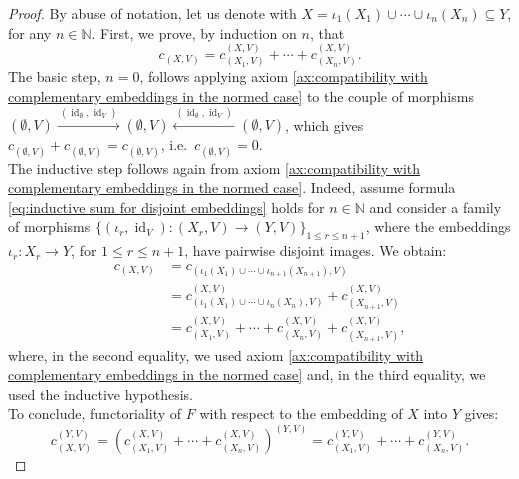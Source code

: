 \documentclass{amsart}
\theoremstyle{definition}
\theoremstyle{plain}
\newcommand{\N}{\mathbb{N}}
\newcommand{\id}{\operatorname{id}}
\begin{document}
        \begin{proof}
            By abuse of notation, let us denote with $X = \iota_1(X_1) \cup \cdots \cup \iota_n(X_n) \subseteq Y$, for any $n \in \N$. 
            First, we prove, by induction on $n$, that 
            \begin{equation}
            \label{eq:inductive sum for disjoint embeddings}
                c_{(X,V)} = c_{(X_1,V)}^{(X,V)} + \cdots + c_{(X_n,V)}^{(X,V)}.
            \end{equation}
            The basic step, $n=0$, follows applying axiom \ref{ax:compatibility with complementary embeddings in the normed case} to the couple of morphisms $(\emptyset,V) \xrightarrow{~(\id_{\emptyset},\id_V)~} (\emptyset,V) \xleftarrow{~(\id_{\emptyset},\id_V)~} (\emptyset,V)$, which gives $c_{(\emptyset,V)} + c_{(\emptyset,V)} = c_{(\emptyset,V)}$, i.e.~$c_{(\emptyset,V)} = 0$. \\
            The inductive step follows again from axiom \ref{ax:compatibility with complementary embeddings in the normed case}. 
            Indeed, assume formula \eqref{eq:inductive sum for disjoint embeddings} holds for $n \in \N$ and consider a family of morphisms $\{(\iota_r,\id_V) \colon (X_r,V) \rightarrow (Y,V)\}_{1 \leq r \leq n+1}$, where the embeddings $\iota_r \colon X_r \rightarrow Y$, for $1 \leq r \leq n+1$, have pairwise disjoint images.  
            We obtain:
            \begin{equation*}
                \begin{split}
                    c_{(X,V)} &= c_{\left( \iota_1(X_1) \cup \cdots \cup \iota_{n+1}(X_{n+1}),V \right)} \\
                    &= c_{\left( \iota_1(X_1) \cup \cdots \cup \iota_n(X_n),V \right)}^{(X,V)} + c_{(X_{n+1},V)}^{(X,V)} \\
                    &= c_{(X_1,V)}^{(X,V)} + \cdots + c_{(X_n,V)}^{(X,V)} + c_{(X_{n+1},V)}^{(X,V)},
                \end{split}
            \end{equation*}
            where, in the second equality, we used axiom \ref{ax:compatibility with complementary embeddings in the normed case} and, in the third equality, we used the inductive hypothesis. \\ 
            To conclude, functoriality of $F$ with respect to the embedding of $X$ into $Y$ gives:
            \begin{equation*}
                c_{(X,V)}^{(Y,V)} = \left( c_{(X_1,V)}^{(X,V)} + \cdots + c_{(X_n,V)}^{(X,V)} \right)^{(Y,V)} = c_{(X_1,V)}^{(Y,V)} + \cdots + c_{(X_n,V)}^{(Y,V)}.
            \end{equation*}
        \end{proof}
\end{document}
